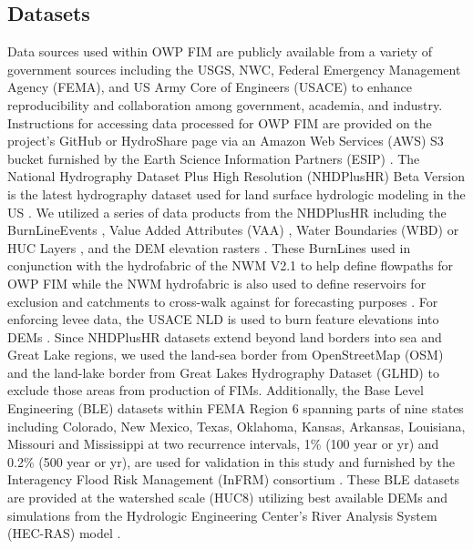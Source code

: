 \subsection{Datasets}
\label{ssec:datasets}
%
Data sources used within OWP FIM are publicly available from a variety of government sources including the USGS, NWC, Federal Emergency Management Agency (FEMA), and US Army Core of Engineers (USACE) to enhance reproducibility and collaboration among government, academia, and industry.
Instructions for accessing data processed for OWP FIM are provided on the project's GitHub or HydroShare page via an Amazon Web Services (AWS) S3 bucket furnished by the Earth Science Information Partners (ESIP) \cite{esipData2022,inundationMapping2022,imHS2023}.
The National Hydrography Dataset Plus High Resolution (NHDPlusHR) Beta Version is the latest hydrography dataset used for land surface hydrologic modeling in the US \cite{moore2019user}.
We utilized a series of data products from the NHDPlusHR including the BurnLineEvents \cite{nhdplus2022vectors}, Value Added Attributes (VAA) \cite{nhdplus2022vectors}, Water Boundaries (WBD) or HUC Layers \cite{nhdplus2022wbd}, and the DEM elevation rasters \cite{nhdplus2022dems}.
These BurnLines used in conjunction with the hydrofabric of the NWM V2.1 to help define flowpaths for OWP FIM while the NWM hydrofabric is also used to define reservoirs for exclusion and catchments to cross-walk against for forecasting purposes \cite{nwm2022hydrofabric}.
For enforcing levee data, the USACE NLD is used to burn feature elevations into DEMs \cite{engineers2016national}.
Since NHDPlusHR datasets extend beyond land borders into sea and Great Lake regions, we used the land-sea border from OpenStreetMap (OSM) \cite{osm2021landsea} and the land-lake border from Great Lakes Hydrography Dataset (GLHD) \cite{GreatLakesHydrographyDataset} to exclude those areas from production of FIMs.
Additionally, the Base Level Engineering (BLE) datasets within FEMA Region 6 spanning parts of nine states including Colorado, New Mexico, Texas, Oklahoma, Kansas, Arkansas, Louisiana, Missouri and Mississippi at two recurrence intervals, 1\% (100 year or yr) and 0.2\% (500 year or yr), are used for validation in this study and furnished by the Interagency Flood Risk Management (InFRM) consortium \cite{fema2021base,fema2021estimated}. 
These BLE datasets are provided at the watershed scale (HUC8) utilizing best available DEMs and simulations from the Hydrologic Engineering Center's River Analysis System (HEC-RAS) model \cite{us2022hydrologic}.
